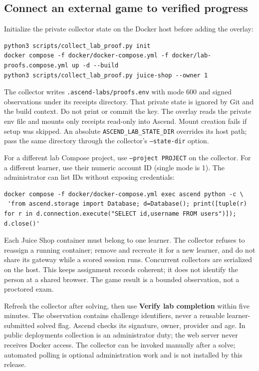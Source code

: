 \subsection{Connect an external game to verified progress}
Initialize the private collector state on the Docker host before adding the overlay:
\begin{verbatim}
python3 scripts/collect_lab_proof.py init
docker compose -f docker/docker-compose.yml -f docker/lab-proofs.compose.yml up -d --build
python3 scripts/collect_lab_proof.py juice-shop --owner 1
\end{verbatim}
The collector writes \texttt{.ascend-labs/proofs.env} with mode 600 and signed
observations under its receipts directory. That private state is ignored by Git and
the build context. Do not print or commit the key. The overlay reads the private env
file and mounts only receipts read-only into Ascend. Mount creation fails if setup
was skipped. An absolute \texttt{ASCEND\_LAB\_STATE\_DIR} overrides its host path;
pass the same directory through the collector's \texttt{--state-dir} option.

For a different lab Compose project, use \texttt{--project PROJECT} on the collector.
For a different learner, use their numeric account ID (single mode is 1). The
administrator can list IDs without exposing credentials:
\begin{verbatim}
docker compose -f docker/docker-compose.yml exec ascend python -c \
 'from ascend.storage import Database; d=Database(); print([tuple(r) for r in d.connection.execute("SELECT id,username FROM users")]); d.close()'
\end{verbatim}
Each Juice Shop container must belong to one learner. The collector refuses to
reassign a running container; remove and recreate it for a new learner, and do not
share its gateway while a scored session runs. Concurrent collectors are serialized
on the host. This keeps assignment records coherent; it does not identify the person
at a shared browser. The game result is a bounded observation, not a proctored exam.

Refresh the collector after solving, then use \textbf{Verify lab completion} within
five minutes. The observation contains challenge identifiers, never a reusable
learner-submitted solved flag. Ascend checks its signature, owner, provider and age.
In public deployments collection is an administrator duty; the web server never
receives Docker access. The collector can be invoked manually after a solve; automated
polling is optional administration work and is not installed by this release.

